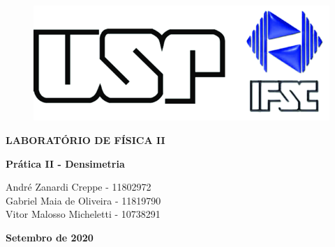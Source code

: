 \thispagestyle{empty}

\begin{figure}
  \centering
  \includegraphics[scale=0.4]{images/logo-usp-ifsc.png}
  \vspace*{-0.3cm}
\end{figure}

\begin{center}
{\large \rm \textbf {LABORATÓRIO DE FÍSICA II} \linebreak}
\end{center}

\baselineskip 30pt

\vspace*{0.3cm}

\begin{center}
{\LARGE \bfseries Prática II - Densimetria}
\end{center}

\vspace*{1cm}

\setcounter{footnote}{1}

\renewcommand{\thefootnote}{\fnsymbol{footnote}}
\begin{center}
{
    \sc  André Zanardi Creppe - 11802972 \\
    \sc  Gabriel Maia de Oliveira - 11819790 \\
    \sc  Vitor Malosso Micheletti - 10738291 \\
}
\vspace*{0.5cm}

\vspace*{-.5cm}
\end{center}


\baselineskip 17pt

\vspace*{1.5cm}
\begin{center}
{{\bf Setembro de 2020}}
\end{center}

\vspace*{.05cm}

\renewcommand{\thefootnote}{\arabic{footnote}}

\setcounter{footnote}{1}

\pagebreak

\baselineskip 19pt
